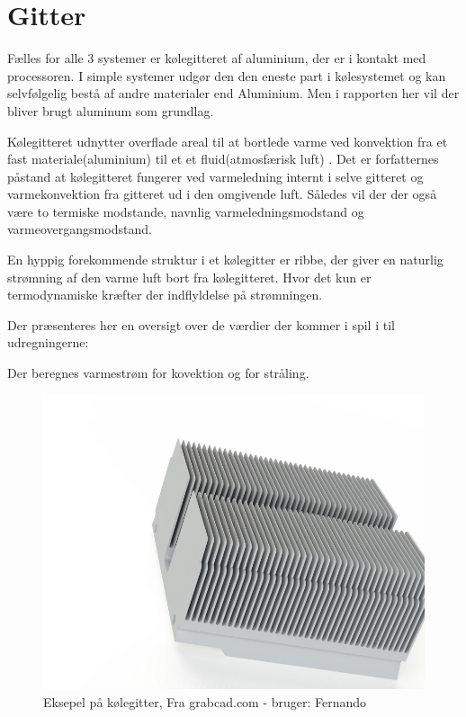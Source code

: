 \section{Gitter}

Fælles for alle 3 systemer er kølegitteret af aluminium, der er i kontakt med processoren. 
I simple systemer udgør den den eneste part i kølesystemet og kan selvfølgelig bestå af andre materialer end Aluminium. 
Men i rapporten her vil der bliver brugt aluminum som grundlag. 

Kølegitteret udnytter overflade areal til at bortlede varme ved konvektion fra et fast materiale(aluminium) til et et fluid(atmosfærisk luft) .
Det er forfatternes påstand at kølegitteret fungerer ved varmeledning internt i selve gitteret og varmekonvektion fra gitteret ud i den omgivende luft.
Således vil der der også være to termiske modstande, navnlig varmeledningsmodstand og varmeovergangsmodstand.

En hyppig forekommende struktur i et kølegitter er ribbe, der giver en naturlig strømning af den varme luft bort fra kølegitteret. Hvor det kun er termodynamiske kræfter der indflyldelse på strømningen.

Der præsenteres her en oversigt over de værdier der kommer i spil i til udregningerne: 

Der beregnes varmestrøm for kovektion og for stråling.

\begin{figure}
	\centering
	\includegraphics[width=0.7\linewidth]{billeder/heatsink1}
	\caption{Eksepel på kølegitter, Fra grabcad.com - bruger: Fernando}
	\label{fig:heatsink1}
\end{figure}


